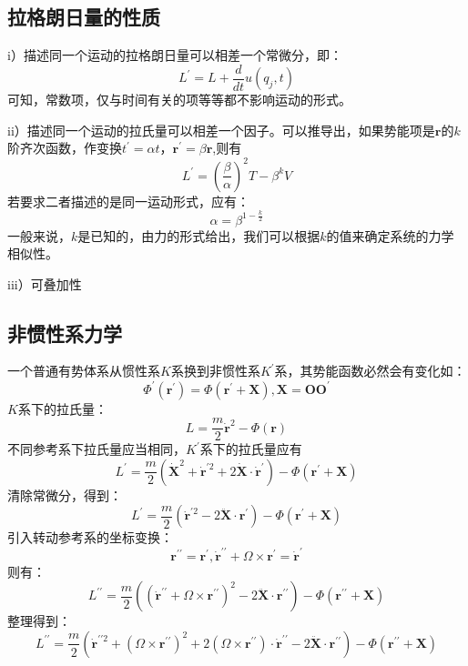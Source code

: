 \documentclass[a4paper, 10pt, openany]{book}%
\begin{document}
    \subsection{拉格朗日量的性质}
    i）描述同一个运动的拉格朗日量可以相差一个常微分，即：
    \begin{equation}
      L^{\prime}=L+\frac{d}{dt}u(q_j,t)
    \end{equation}
    可知，常数项，仅与时间有关的项等等都不影响运动的形式。

    ii）描述同一个运动的拉氏量可以相差一个因子。可以推导出，如果势能项是$\textbf{r}$的$k$阶齐次函数，作变换$t^\prime=\alpha t，\textbf{r}^\prime=\beta\textbf{r}$,则有
    $$L^\prime=(\frac{\beta}{\alpha})^2T-\beta^kV$$
    若要求二者描述的是同一运动形式，应有：
    $$\alpha=\beta^{1-\frac{k}{2}}$$
    一般来说，$k$是已知的，由力的形式给出，我们可以根据$k$的值来确定系统的力学相似性。
    
    iii）可叠加性
    \subsection{非惯性系力学}
    一个普通有势体系从惯性系$K$系换到非惯性系$K^{\prime}$系，其势能函数必然会有变化如：
    $$\Phi^{\prime}(\textbf{r}^\prime)=\Phi(\textbf{r}^\prime+\textbf{X}),\textbf{X}=\textbf{OO}^\prime$$
    $K$系下的拉氏量：
    $$L=\frac{m}{2}\dot{\textbf{r}}^2-\Phi (\textbf{r})$$
    不同参考系下拉氏量应当相同，$K^\prime$系下的拉氏量应有
    $$L^\prime=\frac{m}{2}(\dot{\textbf{X}}^{2}+\dot{\textbf{r}}^{\prime 2}+2\dot{\textbf{X}}\cdot\dot{\textbf{r}}^\prime)-\Phi(\textbf{r}^\prime+\textbf{X})$$
    清除常微分，得到：
    $$L^\prime=\frac{m}{2}(\dot{\textbf{r}}^{\prime 2}-2\ddot{{\textbf{X}}}\cdot{\textbf{r}^\prime})-\Phi(\textbf{r}^\prime+\textbf{X})$$
    引入转动参考系的坐标变换：
    $$\textbf{r}^{\prime \prime}=\textbf{r}^{\prime},\dot{\textbf{r}}^{\prime \prime}+\Omega\times \textbf{r}^\prime=\dot{\textbf{r}}^{\prime} $$
    则有：
    $$L^{\prime\prime}=\frac{m}{2}((\dot{\textbf{r}}^{\prime \prime}+\Omega\times \textbf{r}^{\prime\prime})^2-2\ddot{\textbf{X}}\cdot \textbf{r}^{\prime \prime})-\Phi(\textbf{r}^{\prime\prime}+\textbf{X})$$
    整理得到：
    $$L^{\prime\prime}=\frac{m}{2}(\dot{\textbf{r}}^{\prime \prime2}+(\Omega\times \textbf{r}^{\prime \prime})^2+2(\Omega\times\textbf{r}^{\prime\prime})\cdot\dot{\textbf{r}}^{\prime\prime}-2\ddot{\textbf{X}}\cdot \textbf{r}^{\prime \prime})-\Phi(\textbf{r}^{\prime\prime}+\textbf{X})$$
\end{document}
